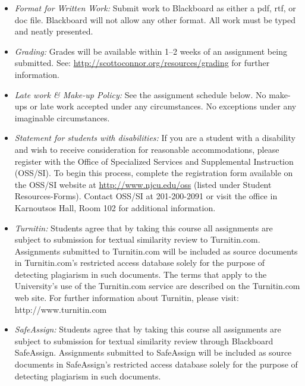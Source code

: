\documentclass[article,oneside]{memoir}
\begin{document}
\begin{itemize}
\item \textit{Format for Written Work:} Submit work to Blackboard as either a pdf, rtf, or doc file. Blackboard will not allow any other format. All work must be typed and neatly presented. 


\item \textit{Grading:} Grades will be available within 1--2 weeks of an assignment being submitted. See: \href{http://scottoconnor.org/resources/grading}{http://scottoconnor.org/resources/grading} for further information.


\item \textit{Late work \& Make-up Policy:} See the assignment schedule below. No make-ups or late work accepted under any circumstances. No exceptions under any imaginable circumstances.

\item \textit{Statement for students with disabilities:} If you are a student
with a disability and wish to receive consideration for reasonable
accommodations, please register with the Office of Specialized Services
and Supplemental Instruction (OSS/SI). To begin this process, complete
the registration form available on the OSS/SI website at
\href{http://www.njcu.edu/oss}{http://www.njcu.edu/oss}
(listed under Student Resources-Forms). Contact OSS/SI at 201-200-2091
or visit the office in Karnoutsos Hall, Room 102 for additional
information.

\item \textit{Turnitin:} Students agree that by taking this course all assignments are subject to submission for textual similarity review to Turnitin.com. Assignments submitted to Turnitin.com will be included as source documents in Turnitin.com's restricted access database solely for the purpose of detecting plagiarism in such documents.  The terms that apply to the University’s use of the Turnitin.com service are described on the Turnitin.com web site.  For further information about Turnitin, please visit: http://www.turnitin.com 

\item \textit{SafeAssign:} Students agree that by taking this course all assignments are subject to submission for textual similarity review through Blackboard SafeAssign. Assignments submitted to SafeAssign will be included as source documents in SafeAssign's restricted access database solely for the purpose of detecting plagiarism in such documents.  


\end{itemize}
\end{document}
